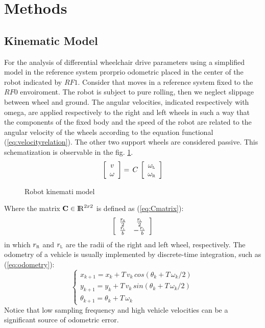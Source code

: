 \section{Methods}
\subsection{Kinematic Model}
For the analysis of differential wheelchair drive parameters using a simplified model in the reference system prorprio odometric placed in the center of the robot indicated by $RF1$. Consider that moves in a reference system fixed to the $RF0$ envoiroment.
The robot is subject to pure rolling, then we neglect slippage between wheel and ground. The angular velocities, indicated respectively with omega, are applied respectively to the right and left wheels in such a way that the components of the fixed body and the speed of the robot are related to the angular velocity of the wheels according to the equation functional (\ref{eq:velocityrelation}).
The other two support wheels are considered passive. This schematization is observable in the fig. \ref{fig:model}.
\begin{equation}
\label{eq:velocityrelation}
	\left[ \begin{array}{cc}
				v	\\									
				\omega 							
			 \end{array} 
	\right]  =\, C\,
	\left[ \begin{array}{cc}
 				\omega_\textsc{l} \\ 
				\omega_\textsc{r}
			 \end{array} 
	\right]
\end{equation}

\begin{figure}[!h]
\centering
    \resizebox{.8\linewidth}{!}{}
\caption{Robot kinemati model}
\label{fig:model}
\end{figure}
\noindent Where the matrix $\textbf{C} \in \operatorname{\rm I\!R}^{2 x 2}$ is defined as (\ref{eq:Cmatrix}):
\begin{equation}
\label{eq:Cmatrix}
	\left[ \begin{array}{cc}
 				\frac{r_\textsc{r}}{2} &	\frac{r_\textsc{l}}{2} \\
				\frac{r_\textsc{l}}{b} &	-\frac{r_\textsc{l}}{b} 
			 \end{array} 
	\right]
\end{equation}
in which $r_\textsc{r}$ and $r_\textsc{l}$ are the radii of the right and left wheel, respectively.
The odometry of a vehicle is usually implemented by discrete-time integration, such as (\ref{eq:odometry}):
\begin{equation}
\label{eq:odometry}
	\begin{cases}
		x_{k+1} = x_{k} + T \, v_{k} \, cos(\theta_{k} + T \,\omega_{k}/2)\\
		y_{k+1} = y_{k} + T \, v_{k} \, sin(\theta_{k} + T \, \omega_{k}/2)\\
		\theta_{k+1} = \theta_{k} + T \, \omega_{k}
	\end{cases}
\end{equation}           
Notice that low sampling frequency and high vehicle velocities can be a significant source of odometric error.

